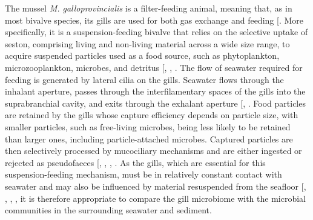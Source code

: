 \documentclass[
  12 pt,
]{article}
\begin{document}
The mussel \emph{M. galloprovincialis} is a filter-feeding animal, meaning that, as in most bivalve species, its gills are used for both gas exchange and feeding {[}\citeproc{ref-Gosling2003a}{37}{]}. More specifically, it is a suspension-feeding bivalve that relies on the selective uptake of seston, comprising living and non-living material across a wide size range, to acquire suspended particles used as a food source, such as phytoplankton, microzooplankton, microbes, and detritus {[}, , \citeproc{ref-Gosling2003c}{96}{]}. The flow of seawater required for feeding is generated by lateral cilia on the gills. Seawater flows through the inhalant aperture, passes through the interfilamentary spaces of the gills into the suprabranchial cavity, and exits through the exhalant aperture {[}, \citeproc{ref-Ward2004}{39}{]}. Food particles are retained by the gills whose capture efficiency depends on particle size, with smaller particles, such as free-living microbes, being less likely to be retained than larger ones, including particle-attached microbes. Captured particles are then selectively processed by mucociliary mechanisms and are either ingested or rejected as pseudofaeces {[}, , , \citeproc{ref-Ward1998}{98}{]}. As the gills, which are essential for this suspension-feeding mechanism, must be in relatively constant contact with seawater and may also be influenced by material resuspended from the seafloor {[}, , , \citeproc{ref-Velasco2005}{48}{]}, it is therefore appropriate to compare the gill microbiome with the microbial communities in the surrounding seawater and sediment.
\end{document}
